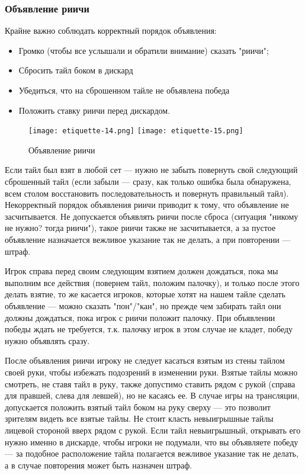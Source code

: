 \subsubsection{Объявление риичи}

Крайне важно соблюдать корректный порядок объявления: 
\begin{itemize}
	\item Громко (чтобы все услышали и обратили внимание) сказать "риичи";
	\item Сбросить тайл боком в дискард
	\item Убедиться, что на сброшенном тайле не объявлена победа
	\item Положить ставку риичи перед дискардом.
\end{itemize}

\begin{figure}[H]
	\centering
	\texttt{[image: etiquette-14.png]}
	\texttt{[image: etiquette-15.png]}
	\caption{Объявление риичи}
\end{figure}

Если тайл был взят в любой сет --- нужно не забыть повернуть свой следующий сброшенный тайл (если забыли --- сразу, как только ошибка была обнаружена, всем столом восстановить последовательность и повернуть правильный тайл). Некорректный порядок объявления риичи приводит к тому, что объявление не засчитывается. Не допускается объявлять риичи после сброса (ситуация "никому не нужно? тогда риичи"), такое риичи также не засчитывается, а за пустое объявление назначается вежливое указание так не делать, а при повторении --- штраф.

Игрок справа перед своим следующим взятием должен дождаться, пока мы выполним все действия (повернем тайл, положим палочку), и только после этого делать взятие, то же касается игроков, которые хотят на нашем тайле сделать объявление --- можно сказать "пон"/"кан", но прежде чем забирать тайл они должны дождаться, пока игрок с риичи положит палочку. При объявлении победы ждать не требуется, т.к. палочку игрок в этом случае не кладет, победу нужно объявлять сразу.

После объявления риичи игроку не следует касаться взятым из стены тайлом своей руки, чтобы избежать подозрений в изменении руки. Взятые тайлы можно смотреть, не ставя тайл в руку, также допустимо ставить рядом с рукой (справа для правшей, слева для левшей), но не касаясь ее. В случае игры на трансляции, допускается положить взятый тайл боком на руку сверху --- это позволит зрителям видеть все взятые тайлы. Не стоит класть невыигрышные тайлы лицевой стороной вверх рядом с рукой. Если тайл невыигрышный, открывать его нужно именно в дискарде, чтобы игроки не подумали, что вы объявляете победу --- за подобное расположение тайла полагается вежливое указание так не делать, а в случае повторения может быть назначен штраф.

